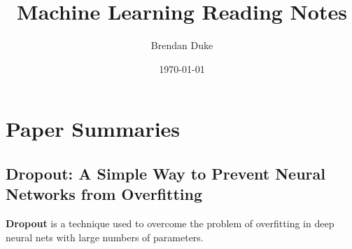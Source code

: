 \documentclass[a4paper, 12pt]{article}
\date{\today}
\title{Machine Learning Reading Notes}
\author{Brendan Duke}
\begin{document}
\maketitle

\section{Paper Summaries}

\subsection{Dropout: A Simple Way to Prevent Neural Networks from
            Overfitting\cite{Srivastava:2014:DSW:2627435.2670313}}

\textbf{Dropout} is a technique used to overcome the problem of overfitting in
deep neural nets with large numbers of parameters.



\end{document}

